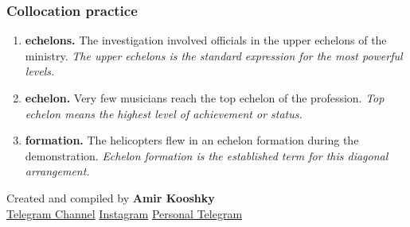 \documentclass[11pt]{article}
\begin{document}
\subsubsection{Collocation practice}
\begin{enumerate}
  \item \textbf{echelons.} The investigation involved officials in the upper echelons of the ministry. \emph{The upper echelons is the standard expression for the most powerful levels.}
  \item \textbf{echelon.} Very few musicians reach the top echelon of the profession. \emph{Top echelon means the highest level of achievement or status.}
  \item \textbf{formation.} The helicopters flew in an echelon formation during the demonstration. \emph{Echelon formation is the established term for this diagonal arrangement.}
\end{enumerate}

\vfill
\begin{center}
\small\color{Muted} Created and compiled by \textbf{Amir Kooshky}\\
\href{https://t.me/KooshkyTOEFL}{Telegram Channel}\quad\textbullet\quad
\href{https://www.instagram.com/kooshkytoefl}{Instagram}\quad\textbullet\quad
\href{https://t.me/KooshkyTOEFL\_pv}{Personal Telegram}
\end{center}
\end{document}
